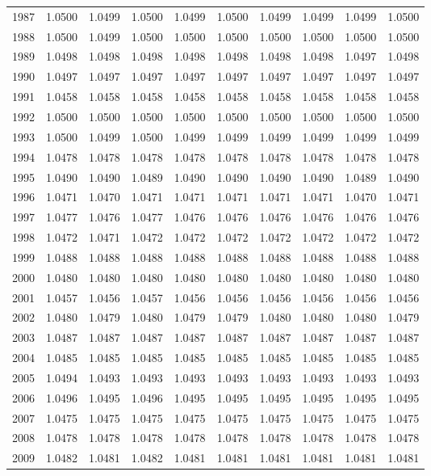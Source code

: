 \begin{tabular}{cccccccccc}
  1987 & 1.0500 & 1.0499 & 1.0500 & 1.0499 & 1.0500 & 1.0499 & 1.0499 & 1.0499 & 1.0500 \\ 
  1988 & 1.0500 & 1.0499 & 1.0500 & 1.0500 & 1.0500 & 1.0500 & 1.0500 & 1.0500 & 1.0500 \\ 
  1989 & 1.0498 & 1.0498 & 1.0498 & 1.0498 & 1.0498 & 1.0498 & 1.0498 & 1.0497 & 1.0498 \\ 
  1990 & 1.0497 & 1.0497 & 1.0497 & 1.0497 & 1.0497 & 1.0497 & 1.0497 & 1.0497 & 1.0497 \\ 
  1991 & 1.0458 & 1.0458 & 1.0458 & 1.0458 & 1.0458 & 1.0458 & 1.0458 & 1.0458 & 1.0458 \\ 
  1992 & 1.0500 & 1.0500 & 1.0500 & 1.0500 & 1.0500 & 1.0500 & 1.0500 & 1.0500 & 1.0500 \\ 
  1993 & 1.0500 & 1.0499 & 1.0500 & 1.0499 & 1.0499 & 1.0499 & 1.0499 & 1.0499 & 1.0499 \\ 
  1994 & 1.0478 & 1.0478 & 1.0478 & 1.0478 & 1.0478 & 1.0478 & 1.0478 & 1.0478 & 1.0478 \\ 
  1995 & 1.0490 & 1.0490 & 1.0489 & 1.0490 & 1.0490 & 1.0490 & 1.0490 & 1.0489 & 1.0490 \\ 
  1996 & 1.0471 & 1.0470 & 1.0471 & 1.0471 & 1.0471 & 1.0471 & 1.0471 & 1.0470 & 1.0471 \\ 
  1997 & 1.0477 & 1.0476 & 1.0477 & 1.0476 & 1.0476 & 1.0476 & 1.0476 & 1.0476 & 1.0476 \\ 
  1998 & 1.0472 & 1.0471 & 1.0472 & 1.0472 & 1.0472 & 1.0472 & 1.0472 & 1.0472 & 1.0472 \\ 
  1999 & 1.0488 & 1.0488 & 1.0488 & 1.0488 & 1.0488 & 1.0488 & 1.0488 & 1.0488 & 1.0488 \\ 
  2000 & 1.0480 & 1.0480 & 1.0480 & 1.0480 & 1.0480 & 1.0480 & 1.0480 & 1.0480 & 1.0480 \\ 
  2001 & 1.0457 & 1.0456 & 1.0457 & 1.0456 & 1.0456 & 1.0456 & 1.0456 & 1.0456 & 1.0456 \\ 
  2002 & 1.0480 & 1.0479 & 1.0480 & 1.0479 & 1.0479 & 1.0480 & 1.0480 & 1.0480 & 1.0479 \\ 
  2003 & 1.0487 & 1.0487 & 1.0487 & 1.0487 & 1.0487 & 1.0487 & 1.0487 & 1.0487 & 1.0487 \\ 
  2004 & 1.0485 & 1.0485 & 1.0485 & 1.0485 & 1.0485 & 1.0485 & 1.0485 & 1.0485 & 1.0485 \\ 
  2005 & 1.0494 & 1.0493 & 1.0493 & 1.0493 & 1.0493 & 1.0493 & 1.0493 & 1.0493 & 1.0493 \\ 
  2006 & 1.0496 & 1.0495 & 1.0496 & 1.0495 & 1.0495 & 1.0495 & 1.0495 & 1.0495 & 1.0495 \\ 
  2007 & 1.0475 & 1.0475 & 1.0475 & 1.0475 & 1.0475 & 1.0475 & 1.0475 & 1.0475 & 1.0475 \\ 
  2008 & 1.0478 & 1.0478 & 1.0478 & 1.0478 & 1.0478 & 1.0478 & 1.0478 & 1.0478 & 1.0478 \\ 
  2009 & 1.0482 & 1.0481 & 1.0482 & 1.0481 & 1.0481 & 1.0481 & 1.0481 & 1.0481 & 1.0481 \\ 
   \hline
\end{tabular}
